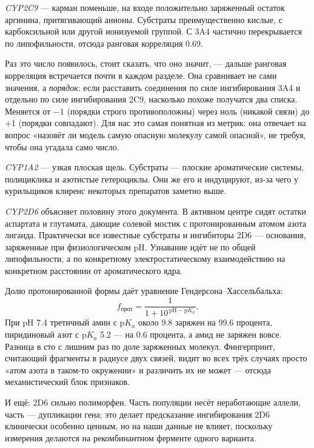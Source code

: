 \emph{CYP2C9} --- карман поменьше, на входе положительно заряженный остаток аргинина, притягивающий
анионы. Субстраты преимущественно кислые, с карбоксильной или другой ионизуемой группой. С 3A4 частично
перекрывается по липофильности, отсюда ранговая корреляция 0.69.

Раз это число появилось, стоит сказать, что оно значит, --- дальше ранговая корреляция
встречается почти в каждом разделе. Она сравнивает не сами значения, а \emph{порядок}: если
расставить соединения по силе ингибирования 3A4 и отдельно по силе ингибирования 2C9,
насколько похоже получатся два списка. Меняется от $-1$ (порядки строго противоположны) через
ноль (никакой связи) до $+1$ (порядки совпадают). Для нас это самая понятная из метрик:
она отвечает на вопрос «назовёт ли модель самую опасную молекулу самой опасной», не требуя,
чтобы она угадала само число.

\emph{CYP1A2} --- узкая плоская щель. Субстраты --- плоские ароматические системы, полициклика
и азотистые гетероциклы. Они же его и индуцируют, из-за чего у курильщиков клиренс некоторых препаратов
заметно выше.

\emph{CYP2D6} объясняет половину этого документа. В активном центре сидят остатки аспартата и глутамата,
дающие солевой мостик с протонированным атомом азота лиганда. Практически все известные субстраты
и ингибиторы 2D6 --- основания, заряженные при физиологическом pH. Узнавание идёт не по общей
липофильности, а по конкретному электростатическому взаимодействию на конкретном расстоянии
от ароматического ядра.

Долю протонированной формы даёт уравнение Гендерсона--Хассельбальха:
\begin{equation}
f_{\text{прот}} = \frac{1}{1 + 10^{\,\mathrm{pH} - \mathrm{p}K_a}} .
\label{eq:hh}
\end{equation}
При pH 7.4 третичный амин с $\mathrm{p}K_a$ около 9.8 заряжен на 99.6 процента, пиридиновый азот
с $\mathrm{p}K_a$ 5.2 --- на 0.6 процента, а амид не заряжен вовсе. Разница в сто с лишним раз
по доле заряженных молекул. Фингерпринт, считающий фрагменты в радиусе двух связей, видит во всех трёх
случаях просто «атом азота в таком-то окружении» и различить их не может --- отсюда механистический
блок признаков.

И ещё: 2D6 сильно полиморфен. Часть популяции несёт
неработающие аллели, часть --- дупликации гена; это делает предсказание ингибирования 2D6 клинически
особенно ценным, но на наши данные не влияет, поскольку измерения делаются на рекомбинантном ферменте
одного варианта.
